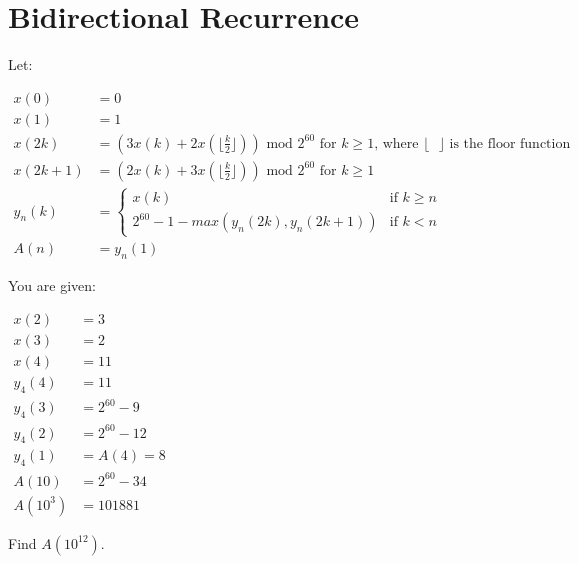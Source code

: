 \section[Problem \#505: Bidirectional Recurrence]{Bidirectional Recurrence}
\label{sec:problem_505}

Let:

$\begin{array}{ll} x(0)&=0 \\ x(1)&=1 \\ x(2k)&=(3x(k)+2x(\lfloor \frac k 2 \rfloor)) \text{ mod } 2^{60} \text{ for } k \ge 1 \text {, where } \lfloor \text { } \rfloor \text { is the floor function} \\ x(2k+1)&=(2x(k)+3x(\lfloor \frac k 2 \rfloor)) \text{ mod } 2^{60} \text{ for } k \ge 1 \\ y_n(k)&=\left\{{\begin{array}{lc} x(k) & \text{if } k \ge n \\ 2^{60} - 1 - max(y_n(2k),y_n(2k+1)) & \text{if } k < n \end{array}} \right. \\ A(n)&=y_n(1) \end{array}$

You are given:

$\begin{array}{ll} x(2)&=3 \\ x(3)&=2 \\ x(4)&=11 \\ y_4(4)&=11 \\ y_4(3)&=2^{60}-9\\ y_4(2)&=2^{60}-12 \\ y_4(1)&=A(4)=8 \\ A(10)&=2^{60}-34\\ A(10^3)&=101881 \end{array}$

Find $A(10^{12})$.